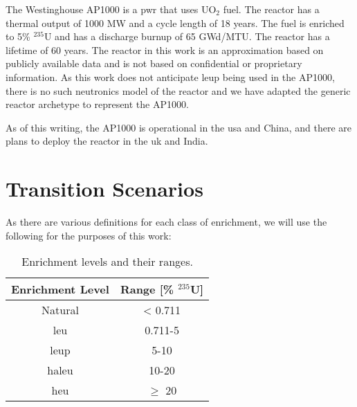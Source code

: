 The Westinghouse AP1000 is a \gls{pwr} that uses UO$_2$ fuel. The reactor has a thermal output of 1000 MW and a cycle length of 18 years. The fuel is enriched to 5\% $^{235}$U and has a discharge burnup of 65 GWd/MTU. The reactor has a lifetime of 60 years. The reactor in this work is an approximation based on publicly available data and is not based on confidential or proprietary information. As this work does not anticipate \gls{leup} being used in the AP1000, there is no such neutronics model of the reactor and we have adapted the generic \cycamore reactor archetype to represent the AP1000.

As of this writing, the AP1000 is operational in the \gls{usa} and China, and there are plans to deploy the reactor in the \gls{uk} and India.

\section{Transition Scenarios}
\label{sec:transition_scenarios}

As there are various definitions for each class of enrichment, we will use the following for the purposes of this work:

\begin{table}[htbp]
   \centering
   \caption{Enrichment levels and their ranges.}
   \label{tab:enrichment_levels}
   \begin{tabular}{c c}
      \hline
      \textbf{Enrichment Level} & \textbf{Range [\%  $^{235}$U]} \\
      \hline
      Natural & < 0.711 \\
      \gls{leu} & 0.711-5 \\
      \gls{leup} & 5-10 \\
      \gls{haleu} & 10-20 \\
      \gls{heu} & $\geq$ 20  \\
      \hline
   \end{tabular}
\end{table}



